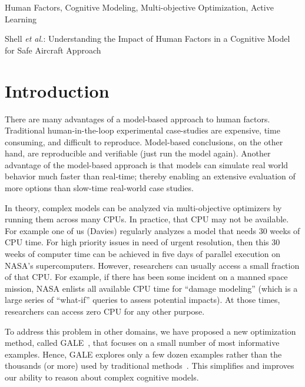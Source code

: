 \documentclass[journal]{IEEEtran}
\begin{document}
\begin{keywords}
Human Factors, Cognitive Modeling, Multi-objective Optimization, Active Learning
\end{keywords}


%
{Shell \MakeLowercase{\textit{et al.}}: Understanding the Impact of Human Factors in a Cognitive Model for Safe Aircraft Approach}


\IEEEdisplaynotcompsoctitleabstractindextext
\IEEEpeerreviewmaketitle



\section{Introduction}
There are many advantages of a model-based approach to human factors. 
Traditional human-in-the-loop experimental case-studies are expensive, time consuming, and difficult to reproduce.
Model-based conclusions, on the other hand, are reproducible and verifiable (just run the model again).
Another advantage of the model-based approach is that models can simulate real world behavior much faster than real-time;
thereby enabling an extensive evaluation of more options than slow-time real-world case studies.

In theory, complex models can be analyzed via multi-objective optimizers by running them across many CPUs. 
In practice, that CPU may not be available.
For example one of us (Davies) regularly analyzes a model that needs 30 weeks of CPU time. 
For high priority issues in need of urgent resolution, then this 30 weeks of computer time can be achieved in five days of parallel execution on NASA's supercomputers.
However,  researchers can usually access a small fraction of that CPU. 
For example, if there has been some incident on a manned space mission,  NASA enlists all available CPU time for ``damage modeling'' (which is a large series of ``what-if'' queries to assess potential impacts). 
At those times, researchers can access zero CPU for any other purpose. 


To address this problem in other domains, we have proposed a new optimization method, called GALE~\cite{krall14aaai,krallphd,galepaper},
that  focuses on a small number of most informative examples.
Hence, GALE explores only a few dozen examples rather than the thousands (or more) used  by traditional methods~\cite{galepaper,krall14aaai}. 
This simplifies and improves our ability to reason about complex cognitive models.
\end{document}
